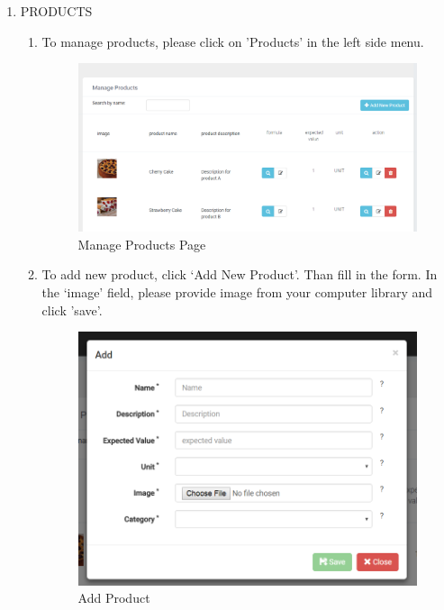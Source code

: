 \documentclass[a4paper,11pt,twoside]{report}
\theoremstyle{definition}
\begin{document}
\begin{enumerate}
\item PRODUCTS
\begin{enumerate}
\item To manage products, please click on 'Products' in the left side menu. 
\begin{figure}[h!]
\begin{center}
\includegraphics[width=\textwidth]{AS/product/1}
\end{center}
\caption{Manage Products Page}
\end{figure}
\thispagestyle{empty}

\item To add new product, click ‘Add New Product’. Than fill in the form. In the ‘image’ field, please provide image from your computer library and click 'save'.
\begin{figure}[h!]
\begin{center}
\includegraphics[width=\textwidth]{AS/product/4}
\end{center}
\caption{Add Product}
\end{figure}
\thispagestyle{empty}


\end{enumerate}
\end{enumerate}
\end{document}
